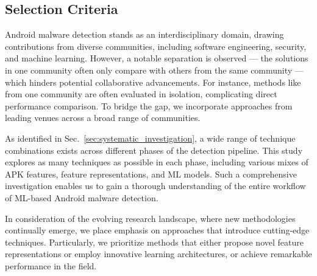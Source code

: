
\subsection{Selection Criteria}
\label{sub:selection_criteria}

Android malware detection stands as an interdisciplinary domain, drawing contributions from diverse communities, including software engineering, security, and machine learning.
However, a notable separation is observed --- the solutions in one community often only compare with others from the same community --- which hinders potential collaborative advancements.
For instance, methods like~\cite{hou2017hindroid,ye2019out} from one community are often evaluated in isolation, complicating direct performance comparison.
To bridge the gap, we incorporate approaches from leading venues across a broad range of communities.

As identified in Sec.~\ref{sec:systematic_investigation}, a wide range of technique combinations exists across different phases of the detection pipeline.
This study explores as many techniques as possible in each phase, including various mixes of APK features, feature representations, and ML models.
Such a comprehensive investigation enables us to gain a thorough understanding of the entire workflow of ML-based Android malware detection.


In consideration of the evolving research landscape, where new methodologies continually emerge, we place emphasis on approaches that introduce cutting-edge techniques.
Particularly, we prioritize methods that either propose novel feature representations or employ innovative learning architectures, or achieve remarkable performance in the field.

